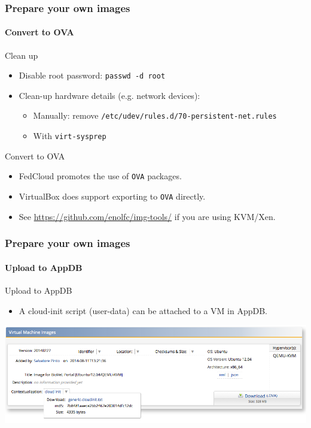 
\begin{frame}
  \frametitle{Prepare your own images}
  \framesubtitle{Convert to OVA}

 \begin{block}{Clean up}
   \begin{itemize}
       \item Disable root password: \texttt{passwd -d root}
       \item Clean-up hardware details (e.g. network devices):
       \begin{itemize}
           \item Manually: remove \texttt{/etc/udev/rules.d/70-persistent-net.rules}
           \item With \texttt{virt-sysprep}
       \end{itemize}
    \end{itemize}
 \end{block}
    
  \begin{block}{Convert to OVA}
    \begin{itemize}
        \item FedCloud promotes the use of \texttt{OVA} packages.
        \item VirtualBox does support exporting to \texttt{OVA} directly.
        \item See \url{https://github.com/enolfc/img-tools/} if you are using KVM/Xen.
    \end{itemize}
  \end{block}
\end{frame}


\begin{frame}
  \frametitle{Prepare your own images}
  \framesubtitle{Upload to AppDB}

  \begin{block}{Upload to AppDB}
    \begin{itemize}
        \item A cloud-init script (user-data) can be attached to a VM
            in AppDB.
    \end{itemize}
    \includegraphics[width=\textwidth]{images/appdb_context}

  \end{block}
\end{frame}

